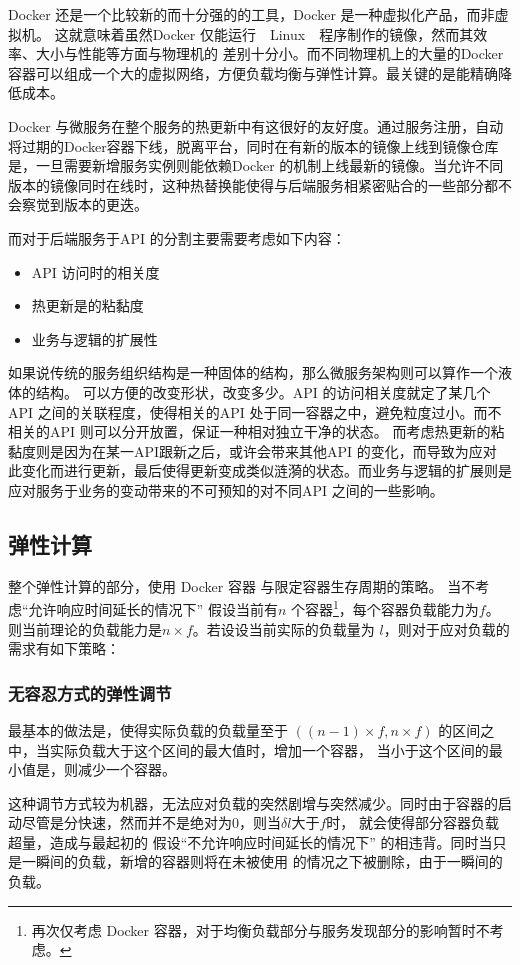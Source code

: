 Docker 还是一个比较新的而十分强的的工具，Docker 是一种虚拟化产品，而非虚拟机。
这就意味着虽然Docker 仅能运行　Linux　程序制作的镜像，然而其效率、大小与性能等方面与物理机的
差别十分小。而不同物理机上的大量的Docker容器可以组成一个大的虚拟网络，方便负载均衡与弹性计算。最关键的是能精确降低成本。

Docker 与微服务在整个服务的热更新中有这很好的友好度。通过服务注册，自动将过期的Docker容器下线，脱离平台，同时在有新的版本的镜像上线到镜像仓库是，一旦需要新增服务实例则能依赖Docker 的机制上线最新的镜像。当允许不同版本的镜像同时在线时，这种热替换能使得与后端服务相紧密贴合的一些部分都不会察觉到版本的更迭。

而对于后端服务于API 的分割主要需要考虑如下内容：
\begin{itemize}
    \item API 访问时的相关度
    \item 热更新是的粘黏度
    \item 业务与逻辑的扩展性
\end{itemize}
如果说传统的服务组织结构是一种固体的结构，那么微服务架构则可以算作一个液体的结构。
可以方便的改变形状，改变多少。API 的访问相关度就定了某几个 API 之间的关联程度，使得相关的API
处于同一容器之中，避免粒度过小。而不相关的API 则可以分开放置，保证一种相对独立干净的状态。
而考虑热更新的粘黏度则是因为在某一API跟新之后，或许会带来其他API 的变化，而导致为应对
此变化而进行更新，最后使得更新变成类似涟漪的状态。而业务与逻辑的扩展则是应对服务于业务的变动带来的不可预知的对不同API 之间的一些影响。

\subsection{弹性计算}
整个弹性计算的部分，使用 Docker 容器 与限定容器生存周期的策略。
当不考虑“允许响应时间延长的情况下”
假设当前有$n$ 个容器\footnote{再次仅考虑 Docker 容器，对于均衡负载部分与服务发现部分的影响暂时不考虑。}，每个容器负载能力为$f$。
则当前理论的负载能力是$n \times f$。若设设当前实际的负载量为 $l$，则对于应对负载的需求有如下策略：
\subsubsection{无容忍方式的弹性调节}
最基本的做法是，使得实际负载的负载量至于 $((n-1) \times f,n \times f)$ 的区间之中，当实际负载大于这个区间的最大值时，增加一个容器，
当小于这个区间的最小值是，则减少一个容器。

这种调节方式较为机器，无法应对负载的突然剧增与突然减少。同时由于容器的启动尽管是分快速，然而并不是绝对为0，则当$\delta l$大于$f$时，
就会使得部分容器负载超量，造成与最起初的 假设“不允许响应时间延长的情况下” 的相违背。同时当只是一瞬间的负载，新增的容器则将在未被使用
的情况之下被删除，由于一瞬间的负载。
